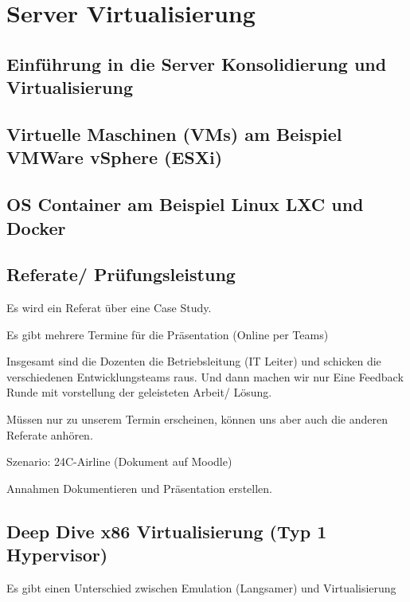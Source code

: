 \documentclass[a4paper]{article}
\title{\docTitle}
\author{Moritz}
\date{\today}
\begin{document}
\maketitle
\tableofcontents


\section{Server Virtualisierung}

\subsection{Einführung in die Server Konsolidierung und Virtualisierung}


\subsection{Virtuelle Maschinen (VMs) am Beispiel VMWare vSphere (ESXi)}


\subsection{OS Container am Beispiel Linux LXC und Docker}

\subsection{Referate/ Prüfungsleistung}

Es wird ein Referat über eine Case Study.

Es gibt mehrere Termine für die Präsentation (Online per Teams)

Insgesamt sind die Dozenten die Betriebsleitung (IT Leiter) und schicken die verschiedenen Entwicklungsteams raus. Und dann machen wir nur Eine Feedback Runde mit vorstellung der geleisteten Arbeit/ Lösung.

Müssen nur zu unserem Termin erscheinen, können uns aber auch die anderen Referate anhören.

Szenario: 24C-Airline (Dokument auf Moodle)

Annahmen Dokumentieren und Präsentation erstellen.


\subsection{Deep Dive x86 Virtualisierung (Typ 1 Hypervisor)}

Es gibt einen Unterschied zwischen Emulation (Langsamer) und Virtualisierung
\end{document}

